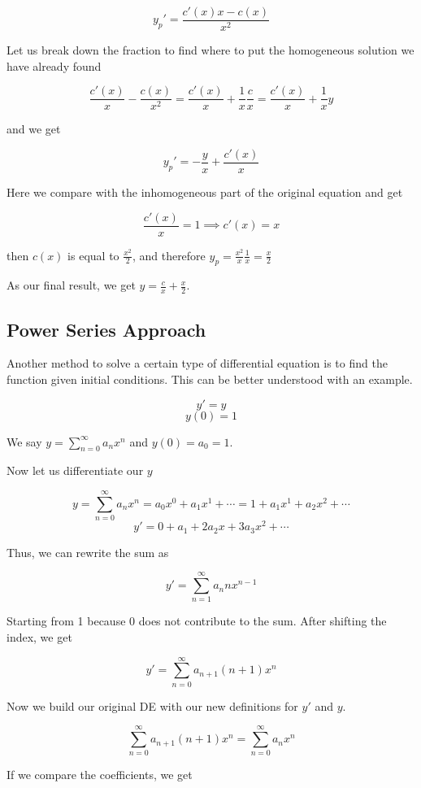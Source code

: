 \[
    y_{p}' = \frac{c'(x)x - c(x)}{x^2}
\]

Let us break down the fraction to find where to put the homogeneous solution we have already found

\[
    \frac{c'(x)}{x} - \frac{c(x)}{x^2} = \frac{c'(x)}{x} + \frac{1}{x}\frac{c}{x}
    = \frac{c'(x)}{x} + \frac{1}{x}y
\]

and we get

\[
    y_{p}' = -\frac{y}{x} + \frac{c'(x)}{x}
\]

Here we compare with the inhomogeneous part of the original equation and get

\[
    \frac{c'(x)}{x} = 1 \implies c'(x) = x
\]

then \(c(x)\) is equal to \(\frac{x^2}{2}\), and therefore \(y_p = \frac{x^2}{x}\frac{1}{x} =
\frac{x}{2}\)

As our final result, we get \(y = \frac{c}{x} + \frac{x}{2}\).

\subsection{Power Series Approach}

Another method to solve a certain type  of differential equation
is to find the function given initial conditions. This can be better understood with an example.

\[
    y' = y
\]
\[
    y(0) = 1
\]

We say \(y = \sum_{n = 0}^{\infty} a_n x^n\) and \(y(0) = a_0 = 1\).

Now let us differentiate our \(y\)

\[
    y = \sum_{n = 0}^{\infty} a_n x^n = a_0 x^0 + a_1 x^1 + \cdots = 1 + a_1 x^1 + a_2 x^2 + \cdots
\]
\[
    y' = 0  + a_1 + 2 a_2 x + 3 a_3 x^2 + \cdots
\]

Thus, we can rewrite the sum as

\[
    y' = \sum_{n = 1}^{\infty} a_n n x^{n - 1}
\]

Starting from 1 because 0 does not contribute to the sum. After shifting the index, we get

\[
    y' = \sum_{n = 0}^{\infty} a_{n + 1}(n + 1)x^{n}
\]

Now we build our original DE with our new definitions for \(y'\) and \(y\).

\[
    \sum_{n = 0}^{\infty} a_{n + 1}(n + 1)x^{n} = \sum_{n = 0}^{\infty} a_n x^n
\]

If we compare the coefficients, we get

